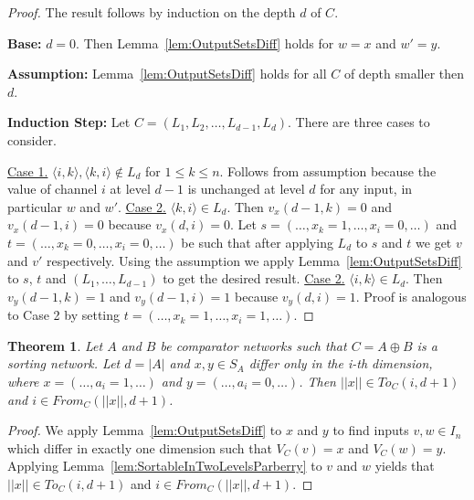 \documentclass[13pt,a4paper]{article}
\newtheorem{theorem}{Theorem}[section]
\begin{document}
\begin{proof}
The result follows by induction on the depth $d$ of $C$.

\textbf{Base:}
$d=0$. Then Lemma~\ref{lem:OutputSetsDiff} holds for $w = x$ and $w' = y$.

\textbf{Assumption:}
Lemma~\ref{lem:OutputSetsDiff} holds for all $C$ of depth smaller then $d$.

\textbf{Induction Step:}
Let $C = (L_1, L_2, \dots, L_{d-1}, L_d)$. There are three cases to consider.

\indent
\indent
\underline{Case 1.} $ \langle i, k \rangle, \langle k, i \rangle \notin L_d$ for $1 \leq k \leq n$.
\indent
Follows from assumption because the value of channel $i$ at level $d-1$ is unchanged at level $d$ for any input, in particular $w$ and $w'$.
\newline
\indent
\indent
\underline{Case 2.} $ \langle k, i \rangle \in L_d$.
\indent
Then $v_x(d-1,k) = 0$ and $v_x(d-1, i) = 0$ because $v_x(d, i) = 0$. 
Let $s = (\dots,x_k = 1,\dots,x_i=0,\dots)$ and $t = (\dots,x_k = 0,\dots,x_i=0,\dots)$ be such that after applying $L_d$ to $s$ and $t$ we get $v$ and $v'$ respectively. Using the assumption we apply Lemma~\ref{lem:OutputSetsDiff} to $s$, $t$ and $(L_1,\dots, L_{d-1})$ to get the desired result.
\newline
\indent
\indent
\underline{Case 2.} $ \langle i, k \rangle \in L_d$.
\indent
Then $v_y(d-1,k) = 1$ and $v_y(d-1, i) = 1$ because $v_y(d, i) = 1$. Proof is analogous to Case 2 by setting $t = (\dots,x_k = 1,\dots,x_i=1,\dots)$.

\end{proof}

\begin{theorem}
\label{th:construct_reach}
Let $A$ and $B$ be comparator networks such that $C = A \oplus B$ is a sorting network. Let $d = \lvert A \lvert$ and $x, y \in S_A$ differ only in the i-th dimension, where $x = (\dots, a_i = 1, \dots)$ and $y = (\dots, a_i = 0, \dots)$.  Then $||x|| \in To_C(i, d+1)$ and $i \in From_C(||x||, d+1)$.
\end{theorem}

\begin{proof}
We apply Lemma~\ref{lem:OutputSetsDiff} to $x$ and $y$ to find inputs $v, w \in I_n$ which differ in exactly one dimension such that $V_C(v) = x$ and $V_C(w) = y$. Applying Lemma~\ref{lem:SortableInTwoLevelsParberry} to $v$ and $w$ yields that $||x|| \in To_C(i, d+1)$ and $i \in From_C(||x||, d+1)$.
\end{proof}
\end{document}
